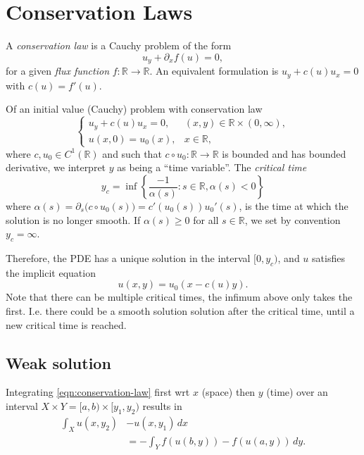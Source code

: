 \section{Conservation Laws}

\begin{defn}
  A \emph{conservation law} is a Cauchy problem of the form
  \begin{equation} \label{eqn:conservation-law}
    u_y + \partial_x f(u) = 0,
  \end{equation}
  for a given \emph{flux function} $f: \mathbb{R} \to \mathbb{R}$. An equivalent
  formulation is $u_y + c(u) u_x = 0$ with $c(u) = f'(u)$.
\end{defn}

\begin{defn}
  Of an initial value (Cauchy) problem with conservation law
  \[
    \begin{cases}
      u_y + c(u) u_x = 0, & (x,y) \in \mathbb{R}\times(0,\infty), \\
      u(x, 0) = u_0(x), & x \in \mathbb{R},
    \end{cases}
  \]
  where $c, u_0 \in C^1(\mathbb{R})$ and such that $c \circ u_0 : \mathbb{R}
  \to \mathbb{R}$ is bounded and has bounded derivative, we interpret $y$ as
  being a ``time variable''. The \emph{critical time}
  \[
    y_c = \inf \left\{
      \frac{-1}{\alpha(s)}:
      s \in \mathbb{R}, \alpha(s) < 0
      \right\}
  \]
  where $\alpha(s) = \partial_s \bigl( c \circ u_0(s) \bigr) =
  c'(u_0(s))u_0'(s)$, is the time at which the solution is no longer smooth.
  If $\alpha(s) \geq 0$ for all $s \in \mathbb{R}$, we set by convention $y_c
  = \infty$.
\end{defn}
Therefore, the PDE has a unique solution in the interval $[0, y_c)$,
and $u$ satisfies the implicit equation
\[
  u(x,y) = u_0(x - c(u)y).
\]
Note that there can be multiple critical times, the infimum above only takes
the first. I.e. there could be a smooth solution solution after the critical
time, until a new critical time is reached.

\subsection{Weak solution}

\begin{defn}
  Integrating \eqref{eqn:conservation-law} first wrt $x$ (space) then $y$
  (time) over an interval $X \times Y = [a,b)\times[y_1, y_2)$ results in
  \begin{align}
    \int_X u(x, y_2) &- u(x, y_1) \,dx \nonumber \\
    &= - \int_Y f(u(b,y)) - f(u(a,y)) \, dy.
    \label{eqn:conservation-law-int}
  \end{align}
\end{defn}

